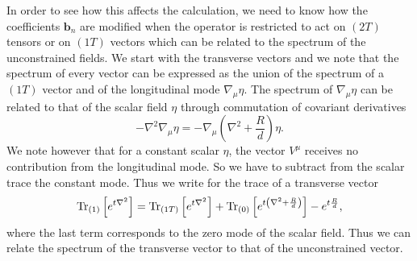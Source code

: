 \documentclass[notitlepage,eqsecnum,bm,amsmath,preprintnumbers,superscriptaddress,nofootinbib,aps,11pt]{revtex4-1}
\begin{document}
In order to see how this affects the calculation, we need to know how the coefficients $\mathbf{b}_n$ are modified when the operator 
is restricted to act on $(2T)$ tensors or on $(1T)$ vectors which can be related
to the spectrum of the unconstrained fields. 
We start with the transverse vectors and we note that the spectrum of every vector can be expressed as the union of the spectrum of a $(1T)$ vector and of the longitudinal mode $\nabla_{\mu}\eta$. The spectrum of $\nabla_{\mu}\eta$ can be related to that of the scalar field $\eta$ through commutation of covariant derivatives
\begin{equation}
-\nabla^2\nabla_{\mu}\eta=-\nabla_{\mu}\left(\nabla^2+\frac{R}{d}\right)\eta.
\end{equation}
We note however that for a constant scalar $\eta$, the vector $V^{\mu}$ receives no contribution from the longitudinal mode. So we have to subtract from the scalar trace the constant mode. Thus we write for the trace of a transverse vector
\begin{equation}
\textnormal{Tr}_{(1)}\left[e^{t\nabla^2}\right]=\textnormal{Tr}_{(1T)}\left[e^{t\nabla^2}\right]+\textnormal{Tr}_{(0)}\left[e^{t\left(\nabla^2+\frac{R}{d}\right)}\right]-e^{t\frac{R}{d}},
\end{equation}
where the last term corresponds to the zero mode of the scalar field. Thus we can relate the spectrum of the transverse vector to that of the unconstrained vector.
\end{document}
